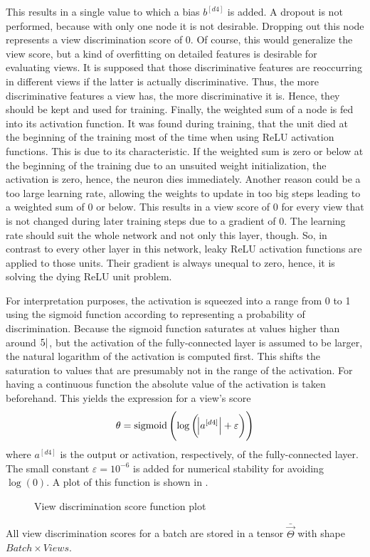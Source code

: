 This results in a single value to which a bias $b^{[d4]}$ is added.
A dropout is not performed, because with only one node it is not desirable.
Dropping out this node represents a view discrimination score of 0.
Of course, this would generalize the view score, but a kind of overfitting on detailed features is desirable for evaluating views.
It is supposed that those discriminative features are reoccurring in different views if the latter is actually discriminative.
Thus, the more discriminative features a view has, the more discriminative it is.
Hence, they should be kept and used for training.
Finally, the weighted sum of a node is fed into its activation function.
It was found during training, that the unit died at the beginning of the training most of the time when using ReLU activation functions.
This is due to its characteristic.
If the weighted sum is zero or below at the beginning of the training due to an unsuited weight initialization, the activation is zero, hence, the neuron dies immediately.
Another reason could be a too large learning rate, allowing the weights to update in too big steps leading to a weighted sum of 0 or below.
This results in a view score of $0$ for every view that is not changed during later training steps due to a gradient of 0.
The learning rate should suit the whole network and not only this layer, though.
So, in contrast to every other layer in this network, leaky ReLU activation functions are applied to those units.
Their gradient is always unequal to zero, hence, it is solving the dying ReLU unit problem.

For interpretation purposes, the activation is squeezed into a range from 0 to 1 using the sigmoid function according to \cite{Feng2018} representing a probability of discrimination.
Because the sigmoid function saturates at values higher than around $\abs{5}$, but the activation of the fully-connected layer is assumed to be larger, the natural logarithm of the activation is computed first.
This shifts the saturation to values that are presumably not in the range of the activation.
For having a continuous function the absolute value of the activation is taken beforehand.
This yields the expression for a view's score
\begin{equation}
	\label{eq:view-discrimination-score}
	\theta = \operatorname{sigmoid}\left( \log \left( \abs{a^{[d4]}} + \varepsilon \right) \right)
\end{equation}
where $a^{[d4]}$ is the output or activation, respectively, of the fully-connected layer.
The small constant $\varepsilon=10^{-6}$ is added for numerical stability for avoiding $\log(0)$.
A plot of this function is shown in .
\begin{figure}
	\setlength{}
	\setlength{}
	\centering
	
	\caption{View discrimination score function plot}
	\label{fig:view-discrimination-score}
\end{figure}
All view discrimination scores for a batch are stored in a tensor $\bar{\vec{\Theta}}$ with shape $Batch \times Views$.

